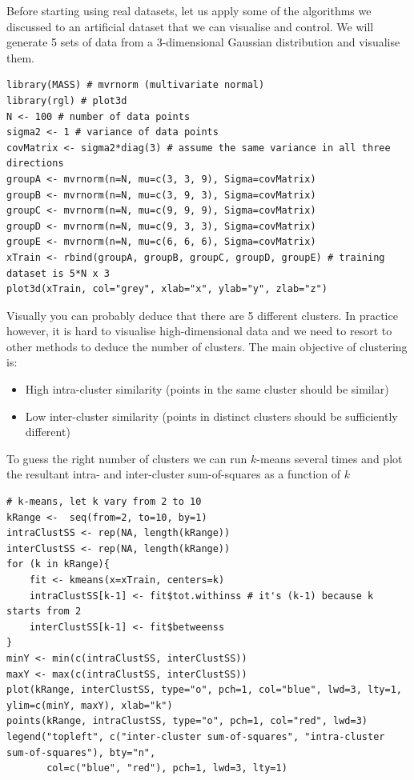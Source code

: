 \documentclass[a4paper,11pt]{article}
\begin{document}
Before starting using real datasets, let us apply some of the algorithms we discussed
to an artificial dataset that we can visualise and control. We will generate 5 sets of data
from a 3-dimensional Gaussian distribution and visualise them.
\vspace{0.3cm}
\begin{lstlisting}[style=RCode]
library(MASS) # mvrnorm (multivariate normal)
library(rgl) # plot3d
N <- 100 # number of data points
sigma2 <- 1 # variance of data points
covMatrix <- sigma2*diag(3) # assume the same variance in all three directions
groupA <- mvrnorm(n=N, mu=c(3, 3, 9), Sigma=covMatrix)
groupB <- mvrnorm(n=N, mu=c(3, 9, 3), Sigma=covMatrix)
groupC <- mvrnorm(n=N, mu=c(9, 9, 9), Sigma=covMatrix)
groupD <- mvrnorm(n=N, mu=c(9, 3, 3), Sigma=covMatrix)
groupE <- mvrnorm(n=N, mu=c(6, 6, 6), Sigma=covMatrix)
xTrain <- rbind(groupA, groupB, groupC, groupD, groupE) # training dataset is 5*N x 3
plot3d(xTrain, col="grey", xlab="x", ylab="y", zlab="z")
\end{lstlisting}
\vspace{-0.2cm}
Visually you can probably deduce that there are 5 different clusters. In practice
however, it is hard to visualise high-dimensional data and we need to resort
to other methods to deduce the number of clusters. 
The main objective of clustering is:

\begin{itemize}
	\item High intra-cluster similarity (points in the same cluster should be similar)
	\item Low inter-cluster similarity (points in distinct clusters should be sufficiently different)
\end{itemize}

To guess the right number of clusters we can run $k$-means several times and plot
the resultant intra- and inter-cluster sum-of-squares as a function of $k$
\vspace{0.3cm}
\begin{lstlisting}[style=RCode]
# k-means, let k vary from 2 to 10
kRange <-  seq(from=2, to=10, by=1)
intraClustSS <- rep(NA, length(kRange))  
interClustSS <- rep(NA, length(kRange))
for (k in kRange){
    fit <- kmeans(x=xTrain, centers=k)
    intraClustSS[k-1] <- fit$tot.withinss # it's (k-1) because k starts from 2
    interClustSS[k-1] <- fit$betweenss
}
minY <- min(c(intraClustSS, interClustSS))
maxY <- max(c(intraClustSS, interClustSS))
plot(kRange, interClustSS, type="o", pch=1, col="blue", lwd=3, lty=1, ylim=c(minY, maxY), xlab="k")
points(kRange, intraClustSS, type="o", pch=1, col="red", lwd=3)
legend("topleft", c("inter-cluster sum-of-squares", "intra-cluster sum-of-squares"), bty="n",
       col=c("blue", "red"), pch=1, lwd=3, lty=1)
\end{lstlisting}
\end{document}
